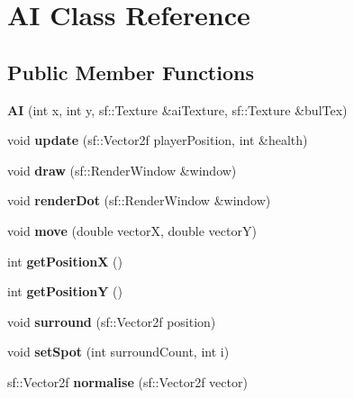 \hypertarget{class_a_i}{}\section{AI Class Reference}
\label{class_a_i}
\subsection*{Public Member Functions}
\begin{DoxyCompactItemize}
\item 
\mbox{\label{class_a_i_a1d782247a4ef257300018bca8701d02e}} 
{\bfseries AI} (int x, int y, sf\+::\+Texture \&ai\+Texture, sf\+::\+Texture \&bul\+Tex)
\item 
\mbox{\label{class_a_i_ae8fa5ecda8a59f687bd75be465994467}} 
void {\bfseries update} (sf\+::\+Vector2f player\+Position, int \&health)
\item 
\mbox{\label{class_a_i_a4ccda3d254a3f604222423d15d4f767f}} 
void {\bfseries draw} (sf\+::\+Render\+Window \&window)
\item 
\mbox{\label{class_a_i_a9394f659105b698a75e1fe77f6014e0b}} 
void {\bfseries render\+Dot} (sf\+::\+Render\+Window \&window)
\item 
\mbox{\label{class_a_i_a9761e86bf135a4ccf1b24326a5a01431}} 
void {\bfseries move} (double vectorX, double vectorY)
\item 
\mbox{\label{class_a_i_ac91b130c717b028b2b712a6b9b29c32f}} 
int {\bfseries get\+PositionX} ()
\item 
\mbox{\label{class_a_i_a3f54bcc3e90cfc46fefd0389c506720b}} 
int {\bfseries get\+PositionY} ()
\item 
\mbox{\label{class_a_i_a14ec51b0b964c0e75c7c7ec2ee4829e4}} 
void {\bfseries surround} (sf\+::\+Vector2f position)
\item 
\mbox{\label{class_a_i_a128f8cf306126950c7085f582ed671c5}} 
void {\bfseries set\+Spot} (int surround\+Count, int i)
\item 
\mbox{\label{class_a_i_a80cd7b646be694678ef28cdf9d9af17e}} 
sf\+::\+Vector2f {\bfseries normalise} (sf\+::\+Vector2f vector)
\end{DoxyCompactItemize}

